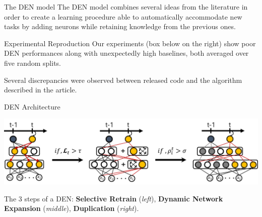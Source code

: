 \documentclass[a0paper,portrait]{baposter}
\begin{document}
\begin{poster}
\begin{posterbox}[name=DEN,column=0,below=intro]{The DEN model}
The DEN model combines several ideas from the literature in order to create a learning procedure able to automatically accommodate new tasks by adding neurons while retaining knowledge from the previous ones.

\begin{algorithm}[H]
\small
\caption{Base DEN algorithm}
\Indm
{}
\Indp
\end{algorithm}
\vspace{2pt}
\end{posterbox}



\begin{posterbox}[name=expe,column=0,below=DEN]{Experimental Reproduction}
Our experiments (box below on the right) show poor DEN performances along with unexpectedly high baselines, both averaged over five random splits.

Several discrepancies were observed between released code and the algorithm described in the article.
\vspace{3pt}
\end{posterbox}



\begin{posterbox}[name=archi,column=1,row=0,span=2]{DEN Architecture}
\begin{center}
    \includegraphics[width=\textwidth]{DEN_layout}
    \label{den_pipe}
\end{center}
\vspace{-25pt}
\small The 3 steps of a DEN: \textbf{Selective Retrain} (\textit{left}), \textbf{Dynamic Network Expansion} (\textit{middle}), \textbf{Duplication} (\textit{right}).
\end{posterbox}



\end{poster}
\end{document}
